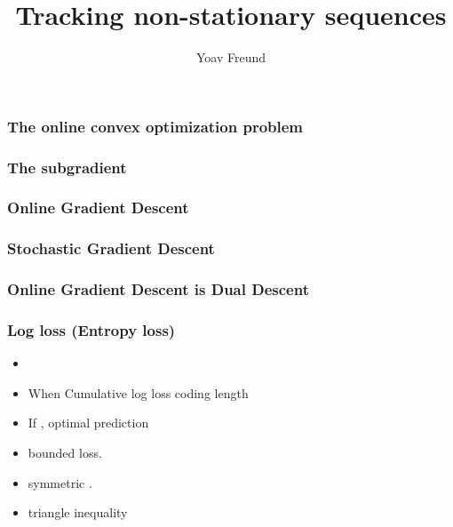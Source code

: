 \documentclass[handout]{beamer}
\title %
{Tracking non-stationary sequences}
\author[Freund] %
{Yoav Freund}
\institute[Universities of Somewhere and Elsewhere] %
\begin{document}
\iffalse %
\fi %


\begin{frame}
  \titlepage
\end{frame}


\newcommand{\CK}{{\cal K}}
\newcommand{\CF}{{\cal F}}
\begin{frame}
  \frametitle{The online convex optimization problem}
  \begin{itemize}
  \item Decision space \R{$\CK \subset R^^n$
  \item Loss functions \R{$$}
  \end{itemize}
\end{frame}

\begin{frame}
\frametitle{The subgradient}
\end{frame}

\begin{frame}
\frametitle{Online Gradient Descent}
\end{frame}

\begin{frame}
\frametitle{Stochastic Gradient Descent}
\end{frame}

\begin{frame}
\frametitle{Online Gradient Descent is Dual Descent}
\end{frame}



\begin{frame}
\frametitle{Log loss (Entropy loss)} 
\begin{itemize}
\item
\R{\[ \lambda_{\text{ent}}(\omega,\gamma) = \omega \ln \frac{\omega}{\gamma} 
                              +(1-\omega) \ln \frac{1-\omega}{1-\gamma} \]}
\item
When  Cumulative log loss \R{$=$} coding length 
\item
If , optimal prediction 
\item
{}bounded loss.
\item
{} symmetric .
\item
{} triangle inequality
\end{itemize}
\end{frame}
\end{document}
